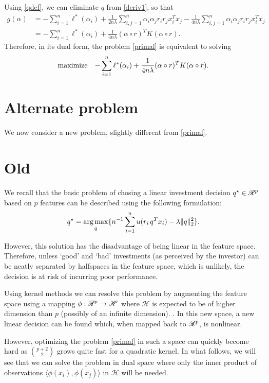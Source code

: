 \documentclass{article}
\newcommand{\sumi}{\sum_{i=1}^n}
\newcommand{\sumij}{\sum_{i,j=1}^n}
\begin{document}
Using \eqref{qdef}, we can eliminate $q$ from \eqref{deriv1}, so that
\begin{align}
  g(\alpha) &= -\sumi \ell^*(\alpha_i) + \frac{1}{2n\lambda}\sumij \alpha_i\alpha_jr_ir_jx_i^Tx_j - \frac{1}{4n\lambda}
         \sumij \alpha_i\alpha_jr_ir_jx_i^Tx_j\\
       &= -\sumi \ell^*(\alpha_i) + \frac{1}{4n\lambda}(\alpha \circ r)^TK(\alpha \circ r). 
\end{align}
Therefore, in its dual form, the problem \eqref{primal} is equivalent to solving
\begin{equation}
  \maximizeEquation{-\sumi \ell^*(\alpha_i) + \frac{1}{4n\lambda}(\alpha \circ r)^TK(\alpha \circ r).}
\end{equation}

\section{Alternate problem}

We now consider a new problem, slightly different from \eqref{primal}.

\section{Old}


We recall that the basic problem of chosing a linear investment decision
$q^\star\in\mathscr{R}^p$ based on $p$ features can be described using the following
formulation:
\begin{equation}
  q^\star = \operatorname*{arg\,max}_q\{ n^{-1} \sum_{i=1}^n u(r_i\,q^Tx_i) - \lambda\|q\|^2_2\}.
\end{equation}

However, this solution has the disadvantage of being linear in the feature
space. Therefore, unless `good' and `bad' investments (as perceived by the investor) can
be neatly separated by halfspaces in the feature space, which is unlikely, the decision is
at risk of incurring poor performance.

Using kernel methods we can resolve this problem by augmenting the feature space using a
mapping $\phi:\mathscr{R}^p\to\mathscr{H}$ where $\mathscr{H}$ is expected to be of higher
dimension than $p$ (possibly of an infinite dimension). . In this new space, a new linear decision can be found
which, when mapped back to $\mathscr{R}^p$, is nonlinear. 

However, optimizing the problem \eqref{primal} in such a space can quickly become hard as
$\binom{p+2}{2}$ grows quite fast for a quadratic kernel. In what follows, we will see
that we can solve the problem in dual space where only the inner product of observations
$\langle \phi(x_i),\phi(x_j)\rangle$ in $\mathscr{H}$ will be needed.
\end{document}
